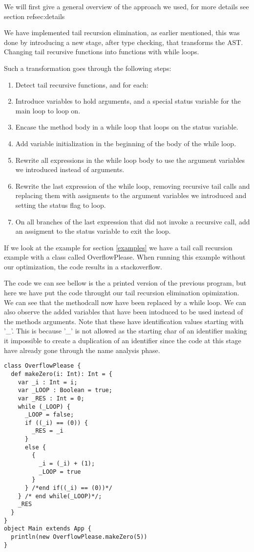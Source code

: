 \label{implementation}
We will first give a general overview of the approach we used, for more details see section ref{sec:details}

We have implemented tail recursion elimination, as earlier mentioned, this was done by introducing a new stage, after type checking, that transforms the AST. Changing tail recursive functions into functions with while loops.

Such a transformation goes through the following steps:

\begin{enumerate}
    \item Detect tail recursive functions, and for each:
    \item Introduce variables to hold arguments, and a special status variable for the main loop to loop on.
    \item Encase the method body in a while loop that loops on the status variable.
    \item Add variable initialization in the beginning of the body of the while loop.
    \item Rewrite all expressions in the while loop body to use the argument variables we introduced instead of arguments. 
    \item Rewrite the last expression of the while loop, removing recursive tail calls and replacing them with assigments to the argument variables we introduced and setting the status flag to loop.
    \item On all branches of the last expression that did not invoke a recursive call, add an assigment to the status variable to exit the loop.
\end{enumerate}

If we look at the example for section \ref{examples} we have a tail call recursion example with a class called OverflowPlease. When running this example without our optimization, the code results in a stackoverflow.  

The code we can see bellow is the a printed version of the previous program, but here we have put the code throught our tail recursion elimination opimization. We can see that the methodcall now have been replaced by a while loop. We can also observe the added variables that have been intoduced to be used instead of the methods arguments. Note that these have identification values starting with '\_'. This is because '\_' is not allowed as the starting char of an identifier making it impossible to create a duplication of an identifier since the code at this stage have already gone through the name analysis phase. 
\begin{lstlisting}
class OverflowPlease {
  def makeZero(i: Int): Int = {
    var _i : Int = i;
    var _LOOP : Boolean = true;
    var _RES : Int = 0;
    while (_LOOP) {
      _LOOP = false;
      if ((_i) == (0)) {
        _RES = _i
      }
      else {
        {
          _i = (_i) + (1);
          _LOOP = true
        }
      } /*end if((_i) == (0))*/
    } /* end while(_LOOP)*/;
    _RES
  }
}
object Main extends App {
  println(new OverflowPlease.makeZero(5)) 
}
\end{lstlisting}



